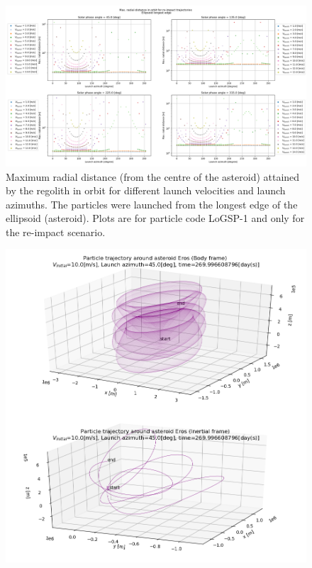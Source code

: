 \documentclass[print]{tudelft-report}
\begin{document}
\begin{appendices}
\begin{figure}[htb]
    \label{fig:trailingEdge_IC_for_24h_orbits}
    \end{figure}
    \FloatBarrier
    \begin{figure}[htb]
    \centering
    \captionsetup{justification=centering}
    \includegraphics[angle=90, width=\textwidth, height=\textheight]{Results/Images/longest_edge_perturbations/3.2Density_1cmSize/maxAltitude_reimpactCase.png}
    \caption{Maximum radial distance (from the centre of the asteroid) attained by the regolith in orbit for different launch velocities and launch azimuths. The particles were launched from the longest edge of the ellipsoid (asteroid). Plots are for particle code LoGSP-1 and only for the re-impact scenario.}
    \label{fig:LoGSP_1_maxAltitude_reimpactscenario}
    \end{figure}
    \FloatBarrier
    \begin{figure}[htb]
    \centering
    \captionsetup{justification=centering}
    \includegraphics[width=\textwidth, height=\textheight]{Results/Images/longest_edge_perturbations/3.2Density_1cmSize/3dTrajectory_10ms_45Azimuth_315solarPhase.png}

\end{figure}
\end{appendices}
\end{document}
